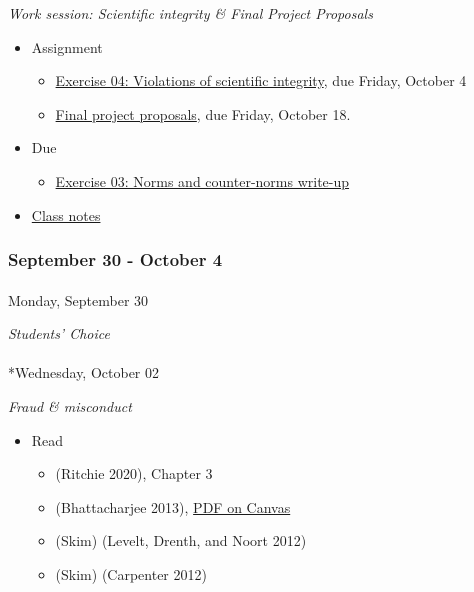 \documentclass[
  letterpaper,
  DIV=11,
  numbers=noendperiod]{scrartcl}
\makeatletter
\let\oldparagraph\paragraph
\renewcommand{\paragraph}{
    \@ifstar
      \xxxParagraphStar
      \xxxParagraphNoStar
  }
\newcommand{\xxxParagraphStar}[1]{\oldparagraph*{#1}\mbox{}}
\newcommand{\xxxParagraphNoStar}[1]{\oldparagraph{#1}\mbox{}}
\providecommand{\tightlist}{%
  \setlength{\itemsep}{0pt}\setlength{\parskip}{0pt}}\usepackage{longtable,booktabs,array}
\makeatother
\begin{document}
\emph{Work session: Scientific integrity \& Final Project Proposals}

\begin{itemize}
\tightlist
\item
  {Assignment}

  \begin{itemize}
  \tightlist
  \item
    \href{exercises/ex04-scientific-integrity.qmd}{Exercise 04:
    Violations of scientific integrity}, {due Friday, October 4}
  \item
    \href{exercises/final-project.qmd}{Final project proposals}, {due
    Friday, October 18}.
  \end{itemize}
\item
  {Due}

  \begin{itemize}
  \tightlist
  \item
    \href{exercises/ex03-norms-counternorms.qmd}{Exercise 03: Norms and
    counter-norms write-up}
  \end{itemize}
\item
  \href{notes/wk05-2024-09-27-work-integrity.qmd}{Class notes}
\end{itemize}

\subsubsection*{September 30 - October 4}\label{week-06}

\paragraph{Monday, September 30}\label{monday-september-30}

\emph{Students' Choice}

\paragraph*{Wednesday, October 02}\label{wednesday-october-02}

\emph{Fraud \& misconduct}

\begin{itemize}
\tightlist
\item
  Read

  \begin{itemize}
  \tightlist
  \item
    (Ritchie 2020), Chapter 3
  \item
    (Bhattacharjee 2013),
    \href{https://psu.instructure.com/courses/2350148/files/folder/readings?preview=165170718}{PDF
    on Canvas}
  \item
    (Skim) (Levelt, Drenth, and Noort 2012)
  \item
    (Skim) (Carpenter 2012)
  \end{itemize}
\end{itemize}
\end{document}
